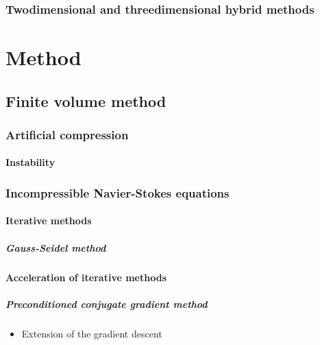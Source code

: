 \documentclass[]{report}
\begin{document}
\section{Twodimensional and threedimensional hybrid methods}


\part{Method}

\chapter{Finite volume method}

\section{Artificial compression}

\subsection{Instability}

\section{Incompressible Navier-Stokes equations}

\subsection{Iterative methods}

\subsubsection{Gauss-Seidel method}

\subsection{Acceleration of iterative methods}

\subsubsection{Preconditioned conjugate gradient method}

\begin{itemize}
    \item Extension of the gradient descent
\end{itemize}
\end{document}
